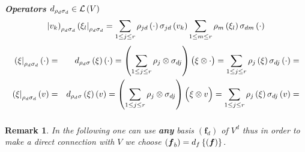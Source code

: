 \documentclass[aps,preprint]{revtex4}
\newtheorem{remark}[theorem]{Remark}
\begin{document}
\subparagraph{Operators $d_{\protect\rho _{d}\protect\sigma _{d}}\in 
\mathcal{L}\left( V\right) $%
\protect\begin{equation}
\left\vert v_{k}\right) _{\protect\rho _{d}\protect\sigma _{d}}\left( 
\protect\xi _{l}\right\vert _{\protect\rho _{d}\protect\sigma %
_{d}}=\sum_{1\leq j\leq r}\protect\rho _{jd}\left( \cdot \right) \protect%
\sigma _{jd}\left( v_{k}\right) \sum_{1\leq m\leq r}\protect\rho _{m}\left( 
\protect\xi _{l}\right) \protect\sigma _{dm}\left( \cdot \right) 
\protect\end{equation}%
\protect\begin{eqnarray}
\left( \protect\xi \right\vert _{\protect\rho _{d}\protect\sigma _{d}}\left(
\cdot \right) &=&d_{\protect\rho _{d}\protect\sigma }\left( \protect\xi %
\right) \left( \cdot \right) =\left( \sum_{1\leq j\leq r}\protect\rho %
_{j}\otimes \protect\sigma _{dj}\right) \left( \protect\xi \protect\overset{}%
{\otimes }\cdot \right) =\sum_{1\leq j\leq r}\protect\rho _{j}\left( \protect%
\xi \right) \protect\sigma _{dj}\left( \cdot \right) = \\
\left( \protect\xi \right\vert _{\protect\rho _{d}\protect\sigma _{d}}\left(
v\right) &=&d_{\protect\rho _{d}\protect\sigma }\left( \protect\xi \right)
\left( v\right) =\left( \sum_{1\leq j\leq r}\protect\rho _{j}\otimes \protect%
\sigma _{dj}\right) \left( \protect\overset{}{\protect\xi \otimes v}\right)
=\sum_{1\leq j\leq r}\protect\rho _{j}\left( \protect\xi \right) \protect%
\sigma _{dj}\left( v\right) = 
\protect\end{eqnarray}%
}

\begin{remark}
In the following one can use \textbf{any} basis $\left( \boldsymbol{f}%
_{d}\right) $ of $V^{d}$ thus in order to make a direct connection with $V$
we choose $\left( \boldsymbol{f}_{b}\right) =d_{f}\left\{ \left( \boldsymbol{%
f}\right) \right\} .$
\end{remark}
\end{document}
